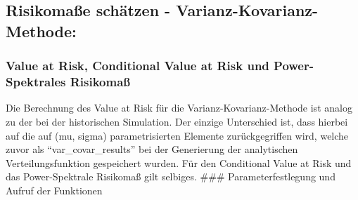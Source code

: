 \documentclass[paper=landscape]{scrartcl}
\begin{document}
    \hypertarget{risikomauxdfe-schuxe4tzen---varianz-kovarianz-methode}{%
\subsection{Risikomaße schätzen -
Varianz-Kovarianz-Methode:}\label{risikomauxdfe-schuxe4tzen---varianz-kovarianz-methode}}

\hypertarget{value-at-risk-conditional-value-at-risk-und-power-spektrales-risikomauxdf}{%
\subsubsection{Value at Risk, Conditional Value at Risk und
Power-Spektrales
Risikomaß}\label{value-at-risk-conditional-value-at-risk-und-power-spektrales-risikomauxdf}}

Die Berechnung des Value at Risk für die Varianz-Kovarianz-Methode ist
analog zu der bei der historischen Simulation. Der einzige Unterschied
ist, dass hierbei auf die auf (mu, sigma) parametrisierten Elemente
zurückgegriffen wird, welche zuvor als ``var\_covar\_results'' bei der
Generierung der analytischen Verteilungsfunktion gespeichert wurden. Für
den Conditional Value at Risk und das Power-Spektrale Risikomaß gilt
selbiges. \#\#\# Parameterfestlegung und Aufruf der Funktionen
\end{document}
